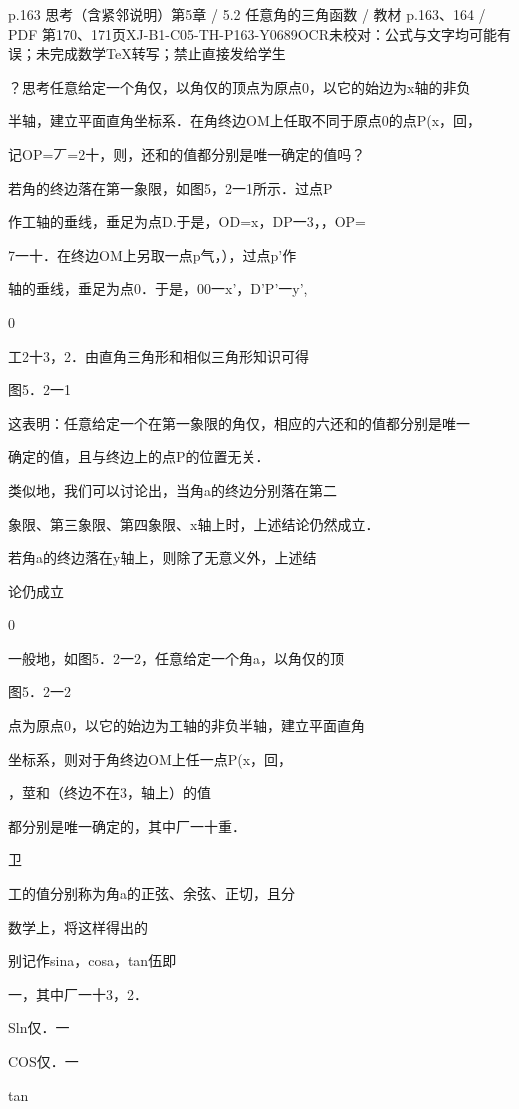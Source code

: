 \begin{bankitem}{p.163 思考（含紧邻说明）}{第5章 / 5.2 任意角的三角函数 / 教材 p.163、164 / PDF 第170、171页}{XJ-B1-C05-TH-P163-Y0689}{OCR未校对：公式与文字均可能有误；未完成数学TeX转写；禁止直接发给学生}
\begin{ocrdraft}
\par
？思考任意给定一个角仅，以角仅的顶点为原点0，以它的始边为x轴的非负
\par
半轴，建立平面直角坐标系．在角终边OM上任取不同于原点0的点P(x，回，
\par
记OP=丆=2十，则，还和的值都分别是唯一确定的值吗？
\par
若角的终边落在第一象限，如图5，2一1所示．过点P
\par
作工轴的垂线，垂足为点D.于是，OD=x，DP一3，，OP=
\par
7一十．在终边OM上另取一点p气，），过点p'作
\par
轴的垂线，垂足为点0．于是，00一x'，D'P'一y',
\par
0
\par
工2十3，2．由直角三角形和相似三角形知识可得
\par
图5．2一1
\par
这表明：任意给定一个在第一象限的角仅，相应的六还和的值都分别是唯一
\par
确定的值，且与终边上的点P的位置无关．
\par
类似地，我们可以讨论出，当角a的终边分别落在第二
\par
象限、第三象限、第四象限、x轴上时，上述结论仍然成立．
\par
若角a的终边落在y轴上，则除了无意义外，上述结
\par
论仍成立
\par
0
\par
一般地，如图5．2一2，任意给定一个角a，以角仅的顶
\par
图5．2一2
\par
点为原点0，以它的始边为工轴的非负半轴，建立平面直角
\par
坐标系，则对于角终边OM上任一点P(x，回，
\par
，莖和（终边不在3，轴上）的值
\par
[教材p.164 / PDF第171页]
\par
都分别是唯一确定的，其中厂一十重．
\par
卫
\par
工的值分别称为角a的正弦、余弦、正切，且分
\par
数学上，将这样得出的
\par
别记作sina，cosa，tan伍即
\par
一，其中厂一十3，2．
\par
Sln仅．一
\par
COS仅．一
\par
tan
\end{ocrdraft}
\end{bankitem}
